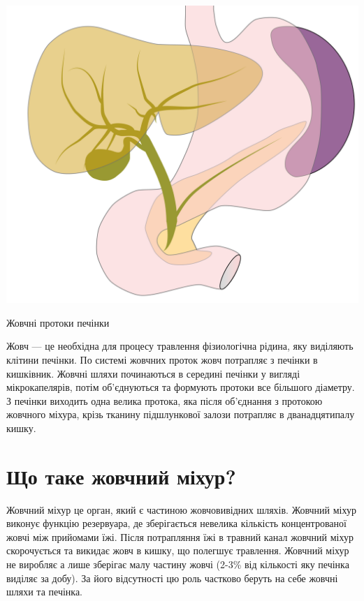 \begin{marginfigure}[-30pt]%
  \includegraphics[width=\linewidth]{Figures/BileDucts_Focus on liver.png}
  \caption{Жовчні протоки печінки}
  \label{fig:bileducts}
\end{marginfigure}

Жовч — це необхідна для процесу травлення фізиологічна рідина, яку виділяють клітини печінки. По системі жовчних проток жовч потрапляє з печінки в кишківник.  Жовчні шляхи починаються в середині печінки у вигляді мікрокапелярів, потім об’єднуються та формують протоки все більшого діаметру. З печінки виходить одна велика протока, яка після об’єднання з протокою жовчного міхура, крізь тканину підшлункової залози потрапляє в дванадцятипалу кишку. 


\section{Що таке жовчний міхур?}

Жовчний міхур це орган, який є частиною жовчовивідних шляхів. Жовчний міхур виконує функцію резервуара, де зберігається невелика кількість концентрованої жовчі між прийомами їжі. Після потрапляння їжі в травний канал жовчний міхур скорочується та викидає жовч в кишку, що полегшує травлення. Жовчний міхур не виробляє а лише зберігає малу частину жовчі (2-3\% від кількості яку печінка виділяє за добу). За його відсутності цю роль частково беруть на себе жовчні шляхи та печінка.

